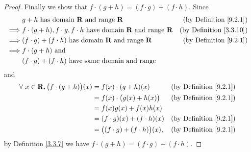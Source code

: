 \begin{proof}
    Finally we show that \(f \cdot (g + h) = (f \cdot g) + (f \cdot h)\).
    Since
    \begin{align*}
                 & g + h \text{ has domain } \mathbf{R} \text{ and range } \mathbf{R}                                   & \text{(by Definition \ref{9.2.1})}  \\
        \implies & f \cdot (g + h), f \cdot g, f \cdot h  \text{ have domain } \mathbf{R} \text{ and range } \mathbf{R} & \text{(by Definition \ref{3.3.10})} \\
        \implies & (f \cdot g) + (f \cdot h)  \text{ has domain } \mathbf{R} \text{ and range } \mathbf{R}              & \text{(by Definition \ref{9.2.1})}  \\
        \implies & f \cdot (g + h) \text{ and }                                                                                                               \\
                 & (f \cdot g) + (f \cdot h) \text{ have same domain and range}
    \end{align*}
    and
    \begin{align*}
        \forall\ x \in \mathbf{R}, \big(f \cdot (g + h)\big)(x) & = f(x) \cdot (g + h)(x)                   & \text{(by Definition \ref{9.2.1})} \\
                                                                & = f(x) \cdot \big(g(x) + h(x)\big)        & \text{(by Definition \ref{9.2.1})} \\
                                                                & = f(x)g(x) + f(x)h(x)                                                          \\
                                                                & = (f \cdot g)(x) + (f \cdot h)(x)         & \text{(by Definition \ref{9.2.1})} \\
                                                                & = \big((f \cdot g) + (f \cdot h)\big)(x), & \text{(by Definition \ref{9.2.1})}
    \end{align*}
    by Definition \ref{3.3.7} we have \(f \cdot (g + h) = (f \cdot g) + (f \cdot h)\).
\end{proof}